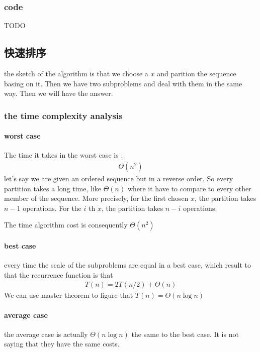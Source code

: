 \documentclass[a4paper, 10pt]{ctexart} %
\begin{document}
\subsubsection{code}
TODO


\subsection{快速排序}
the sketch of the algorithm is that 
we choose a $x$ and parition the sequence 
basing on it. 
Then we have two subproblems and deal with them 
in the same way. Then we will have the answer.

\subsubsection{the time complexity analysis}
\paragraph{worst case}The time it takes in the worst case is :
\begin{align*}
    \Theta \left(n ^{2}\right)
\end{align*}
let's say we are given an ordered sequence but in a reverse order. So every partition takes a 
long time, like $\Theta \left(n\right)$ where it have to compare to every other member of the 
sequence. More precisely, for the first chosen $x$, the partition takes $n-1$ operations. For the $i$ th $x$, the partition 
takes $n - i$ operations. 

The time algorithm cost is consequently $\Theta \left(n^{2}\right)$

\paragraph{best case} %
\label{par:best case}
every time the scale of the subproblems are equal in a best case, which result to that 
the recurrence function is that 
\begin{align*}
    T\left(n \right) =  2 T(n  /2    ) + \Theta \left(n\right)
\end{align*}
We can use master theorem to figure that  $T\left(n\right) = \Theta \left(n \log n\right)$

\paragraph{average case} %
\label{par:average case}
the average case is actually $\Theta \left( n \log n    \right)$ the same to the best case. It is not saying that they have the same costs.
\end{document}
